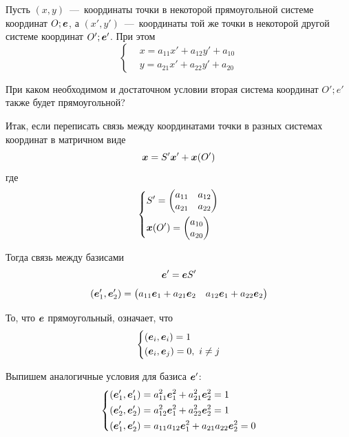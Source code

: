 \documentclass[a4paper,12pt]{article}
\begin{document}
  
  \begin{problem}[4.23]
    Пусть $(x, y)$~---~координаты точки в некоторой прямоугольной системе координат $O; \boldsymbol e$, а $(x', y')$~---~координаты той же точки в некоторой другой системе координат $O'; \boldsymbol e'$.
    При этом
    \[
      \left\{
        \begin{aligned}
          &x = a_{11} x' + a_{12} y' + a_{10}\\
          &y = a_{21} x' + a_{22} y' + a_{20}
        \end{aligned}
      \right.
    \]
    
    При каком необходимом и достаточном условии вторая система координат $O'; e'$ также будет прямоугольной?
  \end{problem}
  
  \begin{solution}
    Итак, если переписать связь между координатами точки в разных системах координат в матричном виде
    \[
      \boldsymbol x = S' \boldsymbol x' + \boldsymbol x(O')
    \]
    где
    \[
      \left\{
        \begin{aligned}
          &S' = \begin{pmatrix}
              a_{11} & a_{12}\\
              a_{21} & a_{22}
            \end{pmatrix}\\
          &\boldsymbol x(O') = \begin{pmatrix}
              a_{10}\\ a_{20}
            \end{pmatrix}
        \end{aligned}
      \right.
    \]
    
    Тогда связь между базисами
    \[
      \boldsymbol e' = \boldsymbol e S'
    \]
    \[
      (\boldsymbol e_1', \boldsymbol e_2') = \begin{pmatrix}
        a_{11} \boldsymbol e_1 + a_{21} \boldsymbol e_2
        & a_{12} \boldsymbol e_1 + a_{22} \boldsymbol e_2
      \end{pmatrix}
    \]
    
    То, что $\boldsymbol e$ прямоугольный, означает, что
    \[
      \left\{
        \begin{aligned}
          &(\boldsymbol e_i, \boldsymbol e_i) = 1\\
          &(\boldsymbol e_i, \boldsymbol e_j) = 0,\ i \not= j
        \end{aligned}
      \right.
    \]
    
    Выпишем аналогичные условия для базиса $\boldsymbol e'$:
    \[
      \left\{
        \begin{aligned}
          &(\boldsymbol e_1', \boldsymbol e_1') = a_{11}^2 \boldsymbol e_1^2 + a_{21}^2 \boldsymbol e_2^2 = 1\\
          &(\boldsymbol e_2', \boldsymbol e_2') = a_{12}^2 \boldsymbol e_1^2 + a_{22}^2 \boldsymbol e_2^2 = 1\\
          &(\boldsymbol e_1', \boldsymbol e_2') = a_{11} a_{12} \boldsymbol e_1^2 + a_{21} a_{22} \boldsymbol e_2^2 = 0
        \end{aligned}
      \right.
    \]
    

\end{solution}
\end{document}
